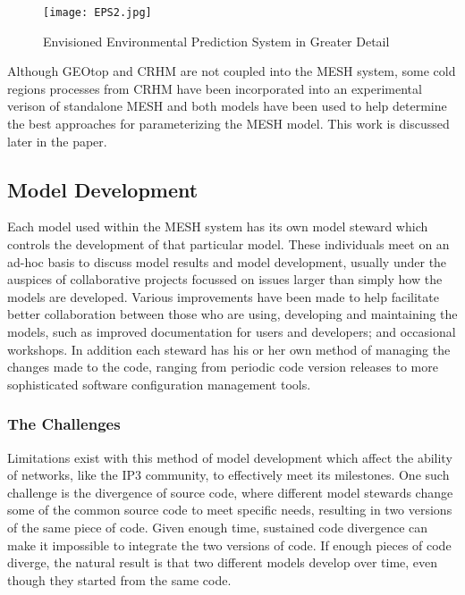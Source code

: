 \documentclass[hess]{copernicus}
\begin{document}
\begin{figure}[h!]
\vspace*{2mm}
\begin{center}
\texttt{[image: EPS2.jpg]}
\end{center}
\caption{Envisioned Environmental Prediction System in Greater Detail}
\label{eps2}
\end{figure}

Although GEOtop and CRHM are not coupled into the MESH system, some cold regions processes from CRHM have been incorporated into an experimental verison of standalone MESH and both models have been used to help determine the best approaches for parameterizing the MESH model. This work is discussed later in the paper.

\subsection{Model Development}
Each model used within the MESH system has its own model steward which controls the development of that particular model. These individuals meet on an ad-hoc basis to discuss model results and model development, usually under the auspices of collaborative projects focussed on issues larger than simply how the models are developed. Various improvements have been made to help facilitate better collaboration between those who are using, developing and maintaining the models, such as improved documentation for users and developers; and occasional workshops. In addition each steward has his or her own method of managing the changes made to the code, ranging from periodic code version releases to more sophisticated software configuration management tools.

\subsubsection{The Challenges}
Limitations exist with this method of model development which affect the ability of networks, like the IP3 community, to effectively meet its milestones. One such challenge is the divergence of source code, where different model stewards change some of the common source code to meet specific needs, resulting in two versions of the same piece of code. Given enough time, sustained code divergence can make it impossible to integrate the two versions of code. If enough pieces of code diverge, the natural result is that two different models develop over time, even though they started from the same code.
\end{document}
